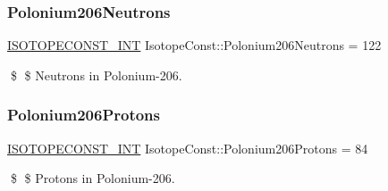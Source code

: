 \subsubsection{\texorpdfstring{Polonium206\+Neutrons}{Polonium206Neutrons}}
{\footnotesize\ttfamily \mbox{\hyperlink{group___isotope_const-_macros_ga5f18360b3e99483a35c32d789e62621c}{I\+S\+O\+T\+O\+P\+E\+C\+O\+N\+S\+T\+\_\+\+I\+NT}} Isotope\+Const\+::\+Polonium206\+Neutrons = 122}

\$ \$ Neutrons in Polonium-\/206. \mbox{\label{group___isotope_const-_polonium-_po206_gae42fc9330d20091192ff61e116189fea}} 
\subsubsection{\texorpdfstring{Polonium206\+Protons}{Polonium206Protons}}
{\footnotesize\ttfamily \mbox{\hyperlink{group___isotope_const-_macros_ga5f18360b3e99483a35c32d789e62621c}{I\+S\+O\+T\+O\+P\+E\+C\+O\+N\+S\+T\+\_\+\+I\+NT}} Isotope\+Const\+::\+Polonium206\+Protons = 84}

\$ \$ Protons in Polonium-\/206. 